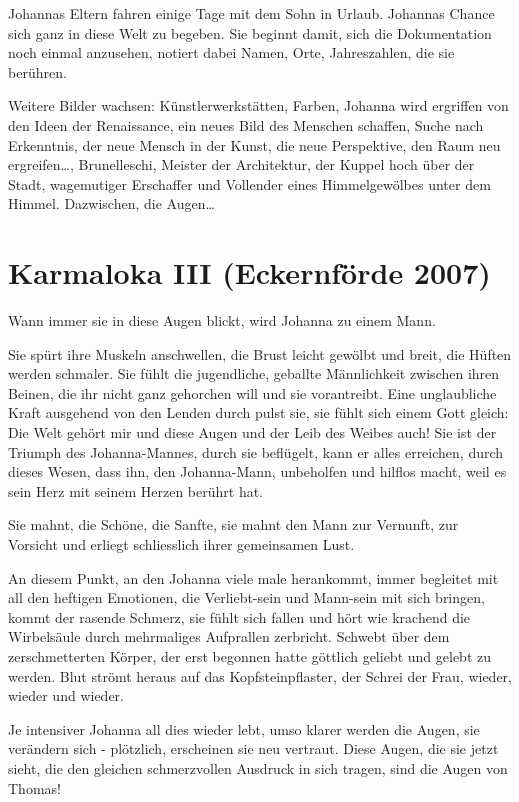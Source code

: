 \documentclass[10pt,titlepage,a5paper]{book}
\begin{document}
Johannas Eltern fahren einige Tage mit dem Sohn in Urlaub. Johannas Chance sich ganz in diese Welt zu begeben. Sie beginnt damit, sich die Dokumentation noch einmal anzusehen, notiert dabei Namen, Orte, Jahreszahlen, die sie berühren.

Weitere Bilder wachsen: Künstlerwerkstätten, Farben, Johanna wird ergriffen von den Ideen der Renaissance, ein neues Bild des Menschen schaffen, Suche  nach Erkenntnis, der neue Mensch in der Kunst, die neue Perspektive, den Raum neu ergreifen\dots , Brunelleschi, Meister der Architektur, der Kuppel hoch über der Stadt, wagemutiger Erschaffer und Vollender eines Himmelgewölbes unter dem Himmel. Dazwischen, die Augen\dots 



\section*{Karmaloka III (Eckernförde 2007)}


Wann immer sie in diese Augen blickt, wird Johanna zu einem Mann.

Sie spürt ihre Muskeln anschwellen, die Brust leicht gewölbt und breit, die Hüften werden schmaler. Sie fühlt die jugendliche, geballte Männlichkeit zwischen ihren Beinen, die ihr nicht ganz gehorchen will und sie vorantreibt. Eine unglaubliche Kraft ausgehend von den Lenden durch pulst sie, sie fühlt sich einem Gott gleich: Die Welt gehört mir und diese Augen und der Leib des Weibes auch! Sie ist der Triumph des Johanna-Mannes, durch sie beflügelt, kann er alles erreichen, durch dieses Wesen, dass ihn, den Johanna-Mann, unbeholfen und hilflos macht, weil es sein Herz mit seinem Herzen berührt hat. 

Sie mahnt, die Schöne, die Sanfte, sie mahnt den Mann zur Vernunft, zur Vorsicht und erliegt schliesslich ihrer gemeinsamen Lust.

An diesem Punkt, an den Johanna viele male herankommt, immer begleitet mit all den heftigen Emotionen, die Verliebt-sein und Mann-sein mit sich bringen, kommt der rasende Schmerz, sie fühlt sich fallen und hört wie krachend die Wirbelsäule durch mehrmaliges Aufprallen zerbricht. Schwebt  über dem zerschmetterten Körper, der erst begonnen hatte göttlich geliebt und gelebt zu werden. Blut strömt heraus auf das Kopfsteinpflaster, der Schrei der Frau, wieder, wieder und wieder.

Je intensiver Johanna all dies wieder lebt, umso klarer werden die  Augen, sie verändern sich - plötzlich, erscheinen sie neu vertraut. Diese Augen, die sie jetzt sieht, die den gleichen schmerzvollen Ausdruck in sich tragen, sind die Augen von Thomas!
\end{document}
